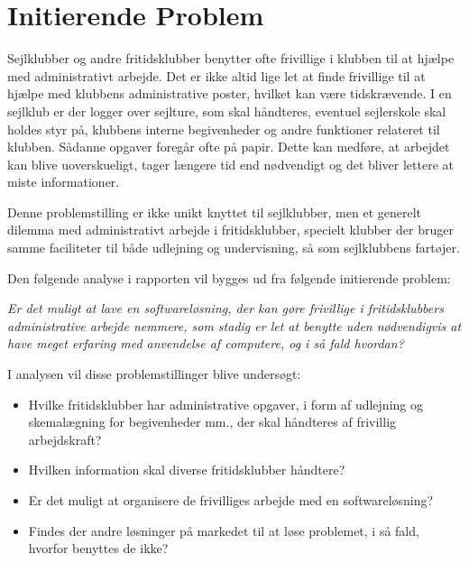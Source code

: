 \section{Initierende Problem}
Sejlklubber og andre fritidsklubber benytter ofte frivillige i klubben til at hjælpe med administrativt arbejde. Det er
ikke altid lige let at finde frivillige til at hjælpe med klubbens administrative poster, hvilket kan være tidskrævende.
I en sejlklub er der logger over sejlture, som skal håndteres, eventuel sejlerskole skal holdes styr på, klubbens interne
begivenheder og andre funktioner relateret til klubben. Sådanne opgaver foregår ofte på papir. Dette kan medføre, at
arbejdet kan blive uoverskueligt, tager længere tid end nødvendigt og det bliver lettere at miste informationer.

Denne problemstilling er ikke unikt knyttet til sejlklubber, men et generelt dilemma med administrativt arbejde i
fritidsklubber, specielt klubber der bruger samme faciliteter til både udlejning og undervisning, så som sejlklubbens
fartøjer.

Den følgende analyse i rapporten vil bygges ud fra følgende initierende problem:

\textit{Er det muligt at lave en softwareløsning, der kan gøre frivillige i fritidsklubbers administrative arbejde
nemmere, som stadig er let at benytte uden nødvendigvis at have meget erfaring med anvendelse af computere, og i så fald
hvordan?}

I analysen vil disse problemstillinger blive undersøgt:
\begin{itemize}
\item Hvilke fritidsklubber har administrative opgaver, i form af udlejning og skemalægning for begivenheder mm., der
skal håndteres af frivillig arbejdskraft?
\item Hvilken information skal diverse fritidsklubber håndtere?
\item Er det muligt at organisere de frivilliges arbejde med en softwareløsning?
\item Findes der andre løsninger på markedet til at løse problemet, i så fald, hvorfor benyttes de ikke?
\end{itemize}